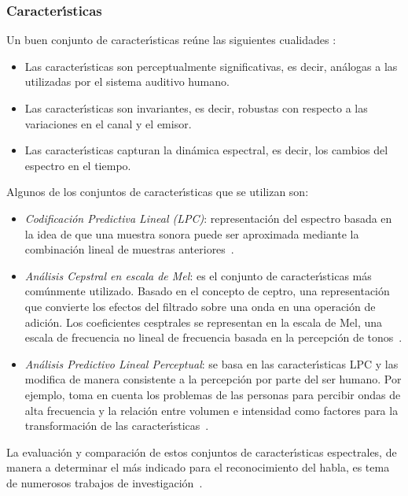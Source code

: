 \subsubsection{Caracter{\'\i}sticas}
Un buen conjunto de caracter{\'\i}sticas re\'une las siguientes cualidades \cite{KesarkarFeature2003}:
\begin{itemize}
\item Las caracter{\'\i}sticas son perceptualmente significativas, es decir, an\'alogas a las utilizadas por el sistema 
auditivo humano.
\item Las caracter{\'\i}sticas son invariantes, es decir, robustas con respecto a las variaciones en el canal y el emisor.
\item Las caracter{\'\i}sticas capturan la din\'amica espectral, es decir, los cambios del espectro en el tiempo.
\end{itemize}

Algunos de los conjuntos de caracter{\'\i}sticas que se utilizan son:
\begin{itemize}
\item \emph{Codificaci\'on Predictiva Lineal (LPC)}: representaci\'on del espectro basada en la idea de que una muestra 
sonora puede ser aproximada mediante la combinaci\'on lineal de muestras \mbox{anteriores \cite{KesarkarFeature2003}}.
\item \emph{An\'alisis Cepstral en escala de Mel}: es el conjunto de caracter{\'\i}sticas m\'as com\'unmente utilizado. 
Basado en el concepto de ceptro, una representaci\'on que convierte los efectos del filtrado sobre una onda en una 
operaci\'on de adici\'on. Los coeficientes cesptrales se representan en la escala de Mel, una escala de frecuencia no
lineal de frecuencia basada en la percepci\'on de \mbox{tonos \cite{Ellis08anintroduction}}.
\item \emph{An\'alisis Predictivo Lineal Perceptual}: se basa en las caracter{\'\i}sticas LPC y las modifica de manera 
consistente a la percepci\'on por parte del ser humano. Por ejemplo, toma en cuenta los problemas de las personas para 
percibir ondas de alta frecuencia y la relaci\'on entre volumen e intensidad como factores para la transformaci\'on de las 
\mbox{caracter{\'\i}sticas \cite{Jurafsky}}. 
\end{itemize}

La evaluaci\'on y comparaci\'on de estos conjuntos de caracter{\'\i}sticas espectrales, de manera a determinar el m\'as 
indicado para el reconocimiento del habla, es tema de numerosos trabajos de 
\mbox{investigaci\'on \cite{DorraComparative2006, SarosiComparison2011, ElminirEvaluation2012}}.